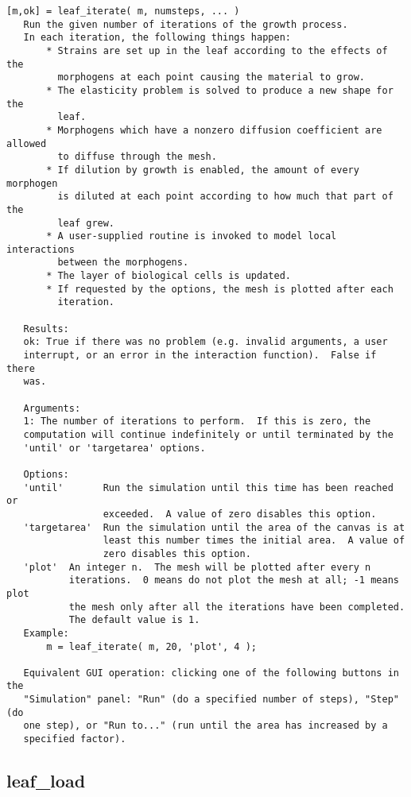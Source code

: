 \begin{verbatim}
[m,ok] = leaf_iterate( m, numsteps, ... )
   Run the given number of iterations of the growth process.
   In each iteration, the following things happen:
       * Strains are set up in the leaf according to the effects of the
         morphogens at each point causing the material to grow.
       * The elasticity problem is solved to produce a new shape for the
         leaf.
       * Morphogens which have a nonzero diffusion coefficient are allowed 
         to diffuse through the mesh.
       * If dilution by growth is enabled, the amount of every morphogen
         is diluted at each point according to how much that part of the
         leaf grew.
       * A user-supplied routine is invoked to model local interactions
         between the morphogens.
       * The layer of biological cells is updated.
       * If requested by the options, the mesh is plotted after each
         iteration.

   Results:
   ok: True if there was no problem (e.g. invalid arguments, a user
   interrupt, or an error in the interaction function).  False if there
   was.

   Arguments:
   1: The number of iterations to perform.  If this is zero, the
   computation will continue indefinitely or until terminated by the
   'until' or 'targetarea' options.

   Options:
   'until'       Run the simulation until this time has been reached or
                 exceeded.  A value of zero disables this option.
   'targetarea'  Run the simulation until the area of the canvas is at
                 least this number times the initial area.  A value of
                 zero disables this option.
   'plot'  An integer n.  The mesh will be plotted after every n
           iterations.  0 means do not plot the mesh at all; -1 means plot
           the mesh only after all the iterations have been completed.
           The default value is 1.
   Example:
       m = leaf_iterate( m, 20, 'plot', 4 );

   Equivalent GUI operation: clicking one of the following buttons in the
   "Simulation" panel: "Run" (do a specified number of steps), "Step" (do
   one step), or "Run to..." (run until the area has increased by a
   specified factor).
\end{verbatim}

\subsection{leaf\_load}\label{section-leaf-load}

